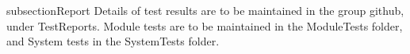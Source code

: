 subsection{Report}
Details of test results are to be maintained in the group github, under TestReports. Module tests are to be maintained in the ModuleTests folder, and System tests in the SystemTests folder.